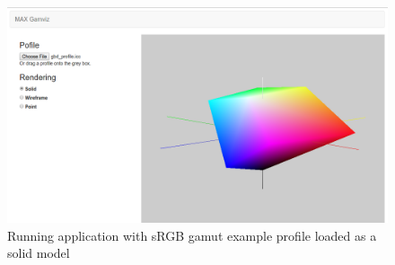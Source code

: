 \begin{figure}[H]
\includegraphics[width=\textwidth]{img/max-gamviz}
\caption{Running application with sRGB gamut example profile loaded as a solid model}
\label{fig:application}
\end{figure}

